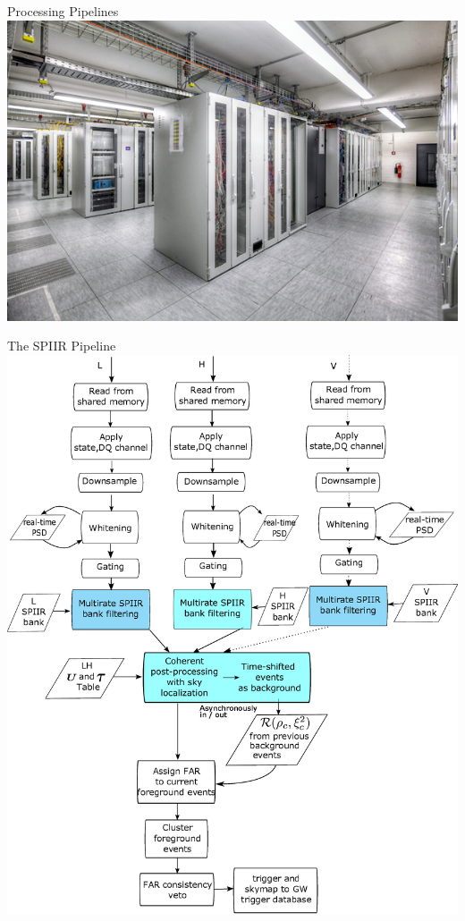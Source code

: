 \documentclass{beamer}
\begin{document}
\begin{frame}{Processing Pipelines}
    \centering
    \includegraphics[width=\textwidth]{faq-atlas-cluster.png}
\end{frame}

\begin{frame}{The SPIIR Pipeline}
    \centering
    \includegraphics[height=0.7\textheight]{online_xdet.jpg}
\end{frame}
\end{document}

